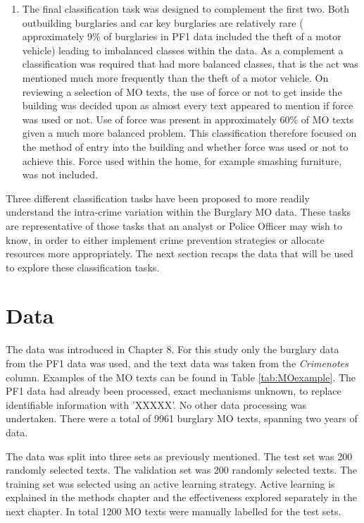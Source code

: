 \begin{enumerate}
 \item The final classification task was designed to complement the first two. Both outbuilding burglaries and car key burglaries are relatively rare ( approximately 9\% of burglaries in PF1 data included the theft of a motor vehicle) leading to imbalanced classes within the data. As a complement a classification was required that had more balanced classes, that is the act was mentioned much more frequently than the theft of a motor vehicle. On reviewing a selection of MO texts, the use of force or not to get inside the building was decided upon as almost every text appeared to mention if force was used or not. Use of force was present in approximately 60\% of MO texts given a much more balanced problem. This classification therefore focused on the method of entry into the building and whether force was used or not to achieve this. Force used within the home, for example smashing furniture, was not included.

\end{enumerate}


Three different classification tasks have been proposed to more readily understand the intra-crime variation within the Burglary MO data. These tasks are representative of those tasks that an analyst or Police Officer may wish to know, in order to either implement crime prevention strategies or allocate resources more appropriately. The next section recaps the data that will be used to explore these classification tasks. 


\section{Data} The data was introduced in Chapter 8. For this study only the burglary data from the PF1 data was used, and the text data was taken from the \emph{Crimenotes} column. Examples of the MO texts can be found in Table \ref{tab:MOexample}. The PF1 data had already been processed, exact mechanisms unknown, to replace identifiable information with 'XXXXX'. No other data processing was undertaken. There were a total of 9961 burglary MO texts, spanning two years of data.

The data was split into three sets as previously mentioned. The test set was 200 randomly selected texts. The validation set was 200 randomly selected texts. The training set was selected using an active learning strategy. Active learning is explained in the methods chapter and the effectiveness explored separately in the next chapter. In total 1200 MO texts were manually labelled for the test sets. 

